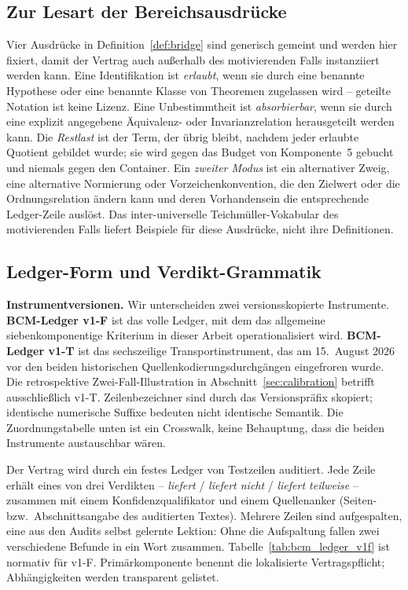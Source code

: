\documentclass[11pt,a4paper]{article}
\begin{document}
\subsection{Zur Lesart der Bereichsausdrücke}\label{sec:glossary}

Vier Ausdrücke in Definition~\ref{def:bridge} sind generisch gemeint und
werden hier fixiert, damit der Vertrag auch außerhalb des motivierenden Falls
instanziiert werden kann. Eine Identifikation ist \emph{erlaubt}, wenn sie
durch eine benannte Hypothese oder eine benannte Klasse von Theoremen
zugelassen wird -- geteilte Notation ist keine Lizenz. Eine Unbestimmtheit
ist \emph{absorbierbar}, wenn sie durch eine explizit angegebene Äquivalenz-
oder Invarianzrelation herausgeteilt werden kann. Die \emph{Restlast} ist der
Term, der übrig bleibt, nachdem jeder erlaubte Quotient gebildet wurde; sie
wird gegen das Budget von Komponente~5 gebucht und niemals gegen den
Container. Ein \emph{zweiter Modus} ist ein alternativer Zweig, eine
alternative Normierung oder Vorzeichenkonvention, die den Zielwert oder die
Ordnungsrelation ändern kann und deren Vorhandensein die entsprechende
Ledger-Zeile auslöst. Das inter-universelle Teichmüller-Vokabular des
motivierenden Falls liefert Beispiele für diese Ausdrücke, nicht ihre
Definitionen.

\subsection{Ledger-Form und Verdikt-Grammatik}\label{sec:ledger}

\noindent\textbf{Instrumentversionen.} Wir unterscheiden zwei
versionsskopierte Instrumente. \textbf{BCM-Ledger v1-F} ist das volle Ledger,
mit dem das allgemeine siebenkomponentige Kriterium in dieser Arbeit
operationalisiert wird. \textbf{BCM-Ledger v1-T} ist das sechszeilige
Transportinstrument, das am 15.~August 2026 vor den beiden historischen
Quellenkodierungsdurchgängen eingefroren wurde. Die retrospektive
Zwei-Fall-Illustration in Abschnitt~\ref{sec:calibration} betrifft
ausschließlich v1-T. Zeilenbezeichner sind durch das Versionspräfix
skopiert; identische numerische Suffixe bedeuten nicht identische Semantik.
Die Zuordnungstabelle unten ist ein Crosswalk, keine Behauptung, dass die
beiden Instrumente austauschbar wären.

\medskip

Der Vertrag wird durch ein festes Ledger von Testzeilen auditiert. Jede Zeile
erhält eines von drei Verdikten -- \emph{liefert} / \emph{liefert nicht} /
\emph{liefert teilweise} -- zusammen mit einem Konfidenzqualifikator und
einem Quellenanker (Seiten- bzw.\ Abschnittsangabe des auditierten Textes).
Mehrere Zeilen sind aufgespalten, eine aus den Audits selbst gelernte
Lektion: Ohne die Aufspaltung fallen zwei verschiedene Befunde in ein Wort
zusammen. Tabelle~\ref{tab:bcm_ledger_v1f} ist normativ für v1-F. \glqq Primärkomponente\grqq{}
benennt die lokalisierte Vertragspflicht; Abhängigkeiten werden transparent
gelistet.
\end{document}
